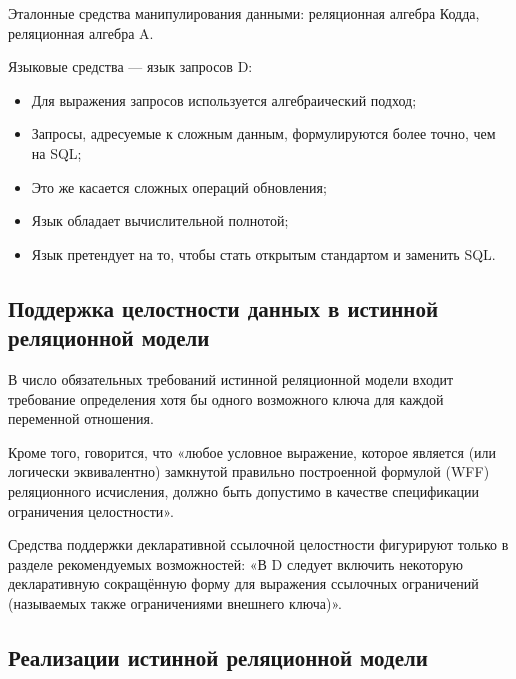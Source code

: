 \documentclass[a4paper,12pt]{article}
\begin{document}
Эталонные средства манипулирования данными: реляционная алгебра Кодда, реляционная алгебра A.

Языковые средства --- язык запросов D:
\begin{itemize}
    \item Для выражения запросов используется алгебраический подход;
    \item Запросы, адресуемые к сложным данным, формулируются более точно, чем на SQL;
    \item Это же касается сложных операций обновления;
    \item Язык обладает вычислительной полнотой;
    \item Язык претендует на то, чтобы стать открытым стандартом и заменить SQL.
\end{itemize}

\subsection{Поддержка целостности данных в истинной реляционной модели}

В число обязательных требований истинной реляционной модели входит требование определения хотя бы одного возможного ключа для каждой переменной отношения.

Кроме того, говорится, что «любое условное выражение, которое является (или логически эквивалентно) замкнутой правильно построенной формулой (WFF) реляционного исчисления, должно быть допустимо в качестве спецификации ограничения целостности».

Средства поддержки декларативной ссылочной целостности фигурируют только в разделе рекомендуемых возможностей: «В D следует включить некоторую декларативную сокращённую форму для выражения ссылочных ограничений (называемых также ограничениями внешнего ключа)».

\subsection{Реализации истинной реляционной модели}
\end{document}
